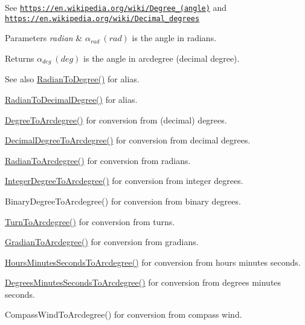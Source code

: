 See \href{https://en.wikipedia.org/wiki/Degree_(angle)}{\tt https\+://en.\+wikipedia.\+org/wiki/\+Degree\+\_\+(angle)} and \href{https://en.wikipedia.org/wiki/Decimal_degrees}{\tt https\+://en.\+wikipedia.\+org/wiki/\+Decimal\+\_\+degrees} 
\begin{DoxyParams}{Parameters}
{\em radian} & $\alpha_{rad}\ (rad)$ is the angle in radians. \\
\hline
\end{DoxyParams}
\begin{DoxyReturn}{Returns}
$\alpha_{deg}\ (deg)$ is the angle in arcdegree (decimal degree). 
\end{DoxyReturn}
\begin{DoxySeeAlso}{See also}
\mbox{\hyperlink{group___e_g_x_math-_angle_conversions-_radian_ga25bbce6cdc1c3621f2a158d320e3bc45}{Radian\+To\+Degree()}} for alias. 

\mbox{\hyperlink{group___e_g_x_math-_angle_conversions-_radian_ga6d170f1882c32de53167c04524d05f67}{Radian\+To\+Decimal\+Degree()}} for alias. 

\mbox{\hyperlink{group___e_g_x_math-_angle_conversions-_degree_gac1b5f3b68f66c77a6df4ceef842c9b19}{Degree\+To\+Arcdegree()}} for conversion from (decimal) degrees. 

\mbox{\hyperlink{group___e_g_x_math-_angle_conversions-_decimal_degree_gacdd463fcabffeb598ebda65b012ce743}{Decimal\+Degree\+To\+Arcdegree()}} for conversion from decimal degrees. 

\mbox{\hyperlink{group___e_g_x_math-_angle_conversions-_radian_ga3dfdc97357cc07f8379976bbc08f9852}{Radian\+To\+Arcdegree()}} for conversion from radians. 

\mbox{\hyperlink{group___e_g_x_math-_angle_conversions-_integer_degree_gaf633d0b82bfb7586ce86ffbcf78d8f7a}{Integer\+Degree\+To\+Arcdegree()}} for conversion from integer degrees. 

Binary\+Degree\+To\+Arcdegree() for conversion from binary degrees. 

\mbox{\hyperlink{group___e_g_x_math-_angle_conversions-_turn_ga7bdc3a81ce316dd47b1a3179489fa195}{Turn\+To\+Arcdegree()}} for conversion from turns. 

\mbox{\hyperlink{group___e_g_x_math-_angle_conversions-_gradian_gacd0b1797f2460944dcbc541a855ec21c}{Gradian\+To\+Arcdegree()}} for conversion from gradians. 

\mbox{\hyperlink{group___e_g_x_math-_angle_conversions-_hours_minutes_seconds_ga3c38143df47da88534ddbd13726748e2}{Hours\+Minutes\+Seconds\+To\+Arcdegree()}} for conversion from hours minutes seconds. 

\mbox{\hyperlink{group___e_g_x_math-_angle_conversions-_degrees_minutes_seconds_ga71fd0a3b9238a3a4fde150802938dee8}{Degrees\+Minutes\+Seconds\+To\+Arcdegree()}} for conversion from degrees minutes seconds. 

Compass\+Wind\+To\+Arcdegree() for conversion from compass wind. 
\end{DoxySeeAlso}
\mbox{\label{group___e_g_x_math-_angle_conversions-_radian_ga722e3b8e78540a6b3942b73b64aeb8d2}} 
